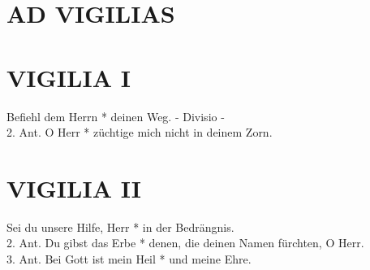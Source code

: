 \thispagestyle{plain}






\section[vigiliae]{AD VIGILIAS}

\begin{sloppypar}
{}
\end{sloppypar}

\bigskip


\section{VIGILIA I}



\begin{sloppypar}
{  Befiehl  dem Herrn * deinen Weg.  - Divisio -  \\  
2. Ant. O Herr * züchtige mich nicht in deinem Zorn. \\}
\end{sloppypar}

\begin{flushleft}


\end{flushleft}



\section{VIGILIA II}



\begin{sloppypar}
{ Sei du unsere Hilfe, Herr * in der Bedrängnis.  \\
2. Ant. Du gibst das Erbe * denen, die deinen Namen fürchten, O Herr.  \\
3. Ant. Bei Gott ist mein Heil * und meine Ehre.  \\}
\end{sloppypar}

